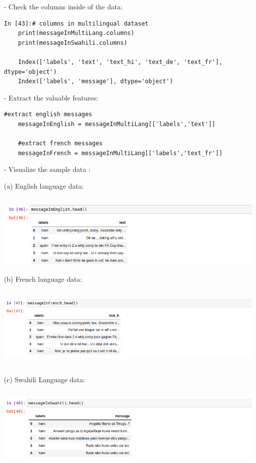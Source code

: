 \documentclass[12pt,a4paper, oneside]{book}
\begin{document}
- Check the columns inside of the data:
\begin{lstlisting}[style=stylejupyter]
In [43]:# columns in multilingual dataset 
	print(messageInMultiLang.columns) 
	print(messageInSwahili.columns) 
	
	Index(['labels', 'text', 'text_hi', 'text_de', 'text_fr'], dtype='object')
	Index(['labels', 'message'], dtype='object')
\end{lstlisting}
- Extract the valuable features:
\begin{lstlisting}[style=stylejupyter]
	#extract english messages
	messageInEnglish = messageInMultiLang[['labels','text']] 
	
	#extract french messages
	messageInFrench = messageInMultiLang[['labels','text_fr']]
\end{lstlisting}

- Visualize the sample data :

(a) English language data:

\includegraphics[height=4cm,width=1\linewidth]{CollectImages/headViewsEnglish}\\

(b) French language data:

\includegraphics[height=4cm,width=1\linewidth]{CollectImages/headViewsFrench}

(c) Swahili Language data: 
 
\includegraphics[height=4cm,width=1\linewidth]{CollectImages/headViewsSwahili} 
\\
\end{document}
